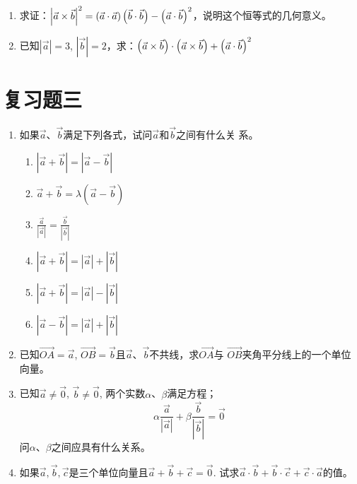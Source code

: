 \begin{enumerate}
\item 求证：$\left|\vec{a}\times \vec{b}\right|^2=\left(\vec{a}\cdot \vec{a}\right)\left(\vec{b}\cdot \vec{b}\right)-\left(\vec{a}\cdot \vec{b}\right)^2$，说明这个恒等式的几何意义。

\item 已知$|\vec{a}|=3$, $|\vec{b}|=2$，求：$\left(\vec{a}\times\vec{b}\right)\cdot \left(\vec{a}\times\vec{b}\right)+\left(\vec{a}\cdot \vec{b}\right)^2$
\end{enumerate}

\section*{复习题三}

\begin{enumerate}
    \item 如果$\vec{a}$、$\vec{b}$满足下列各式，试问$\vec{a}$和$\vec{b}$之间有什么关
    系。
\begin{multicols}{2}
\begin{enumerate}
    \item $\left|\vec{a}+\vec{b}\right|=\left|\vec{a}-\vec{b}\right|$
    \item $\vec{a}+\vec{b}=\lambda\left(\vec{a}-\vec{b}\right)$
    \item $\frac{\vec{a}}{\left|\vec{a}\right|}=\frac{\vec{b}}{\left|\vec{b}\right|}$
    \item $\left|\vec{a}+\vec{b}\right|=\left|\vec{a}\right|+\left|\vec{b}\right|$
    \item $\left|\vec{a}+\vec{b}\right|=\left|\vec{a}\right|-\left|\vec{b}\right|$
    \item $\left|\vec{a}-\vec{b}\right|=\left|\vec{a}\right|+\left|\vec{b}\right|$
\end{enumerate}
\end{multicols}

\item 已知$\Vec{OA}=\vec{a}$, $\Vec{OB}=\vec{b}$且$\vec{a}$、$\vec{b}$不共线，求$\Vec{OA}$与
$\Vec{OB}$夹角平分线上的一个单位向量。
\item 已知$\vec{a}\ne \vec{0}$, $\vec{b}\ne\vec{0}$, 两个实数$\alpha$、$\beta$满足方程；
\[\alpha\frac{\vec{a}}{|\vec{a}|}+\beta\frac{\vec{b}}{|\vec{b}|}=\vec{0}\]
问$\alpha$、$\beta$之间应具有什么关系。

\item 如果$\vec{a},\vec{b},\vec{c}$是三个单位向量且$\vec{a}+\vec{b}+\vec{c}=\vec{0}$. 
试求$\vec{a}\cdot \vec{b}+\vec{b}\cdot \vec{c}+\vec{c}\cdot \vec{a}$的值。


\end{enumerate}
